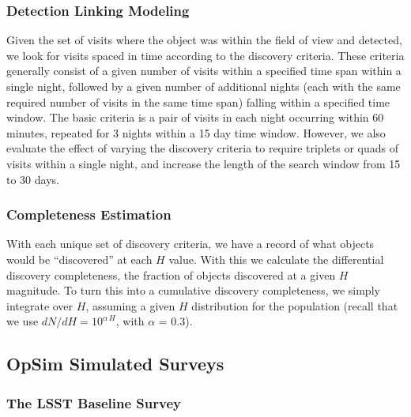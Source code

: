 \subsubsection{Detection Linking Modeling}

Given the set of visits where the object was within the field of view and detected, we look for visits spaced in time
according to the discovery criteria. These criteria generally consist of a given number of visits within a specified
time span within a single night, followed by a given number of additional nights (each with the same required number
of visits in the same time span) falling within a specified time window. The basic criteria is a pair of visits in each
night occurring within 60 minutes, repeated for 3 nights within a 15 day time window. However, we also evaluate
the effect of varying the discovery criteria to require triplets or quads of visits within a single night, and increase
the length of the search window from 15 to 30 days.


\subsubsection{Completeness Estimation}

With each unique set of discovery criteria, we have a record of what objects would be ``discovered'' at each $H$ value.
With this we calculate the differential discovery completeness, the fraction of objects discovered at a given $H$ magnitude.
To turn this into a cumulative discovery completeness, we simply integrate over $H$, assuming a given $H$ distribution
for the population (recall that we use $dN/dH = 10^{\alpha\, H}$, with $\alpha$ = 0.3).


\subsection{OpSim Simulated Surveys \label{sec:surveys}}

\subsubsection{The LSST Baseline Survey}

